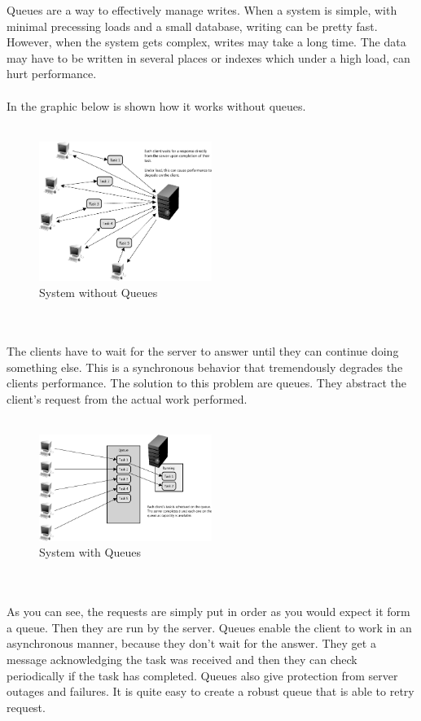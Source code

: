 \documentclass[12p]{article}
\begin{document}
	Queues are a way to effectively manage writes. When a system is simple, with minimal precessing loads and a small database, writing can be pretty fast.  However, when the system gets complex, writes may take a long time. The data may have to be written in several places or indexes which under a high load, can hurt performance. \\\\
	In the graphic below is shown how it works without queues. \\\\
	\begin{figure}[h!]
		\centering
		\includegraphics[width=0.5\textwidth]{img/queue1}
		\caption{System without Queues\cite{cache}}
	\end{figure}
	\\\\	
	The clients have to wait for the server to answer until they can continue doing something else. This is a synchronous behavior that tremendously degrades the clients performance. The solution to this problem are queues. They abstract the client's request from the actual work performed. \\\\
	\begin{figure}[h!]
		\centering
		\includegraphics[width=0.5\textwidth]{img/queue2}
		\caption{System with Queues\cite{cache}}
	\end{figure}	
	\\\\
	As you can see, the requests are simply put in order as you would expect it form a queue. Then they are run by the server. Queues enable the client to work in an asynchronous manner, because they don't wait for the answer. They get a message acknowledging the task was received and then they can check periodically if the task has completed. Queues also give protection from server outages and failures. It is quite easy to create a robust queue that is able to retry request. 
\end{document}
